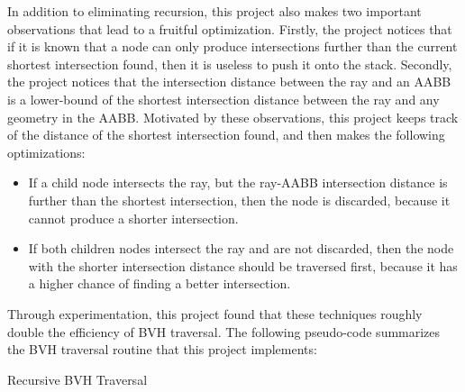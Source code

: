 In addition to eliminating recursion, this project also makes two important observations that lead to a fruitful optimization. Firstly, the project notices that if it is known that a node can only produce intersections further than the current shortest intersection found, then it is useless to push it onto the stack. Secondly, the project notices that the intersection distance between the ray and an AABB is a lower-bound of the shortest intersection distance between the ray and any geometry in the AABB. Motivated by these observations, this project keeps track of the distance of the shortest intersection found, and then makes the following optimizations:
\begin{itemize}
    \item If a child node intersects the ray, but the ray-AABB intersection distance is further than the shortest intersection, then the node is discarded, because it cannot produce a shorter intersection.
    \item If both children nodes intersect the ray and are not discarded, then the node with the shorter intersection distance should be traversed first, because it has a higher chance of finding a better intersection.
\end{itemize}
Through experimentation, this project found that these techniques roughly double the efficiency of BVH traversal. The following pseudo-code summarizes the BVH traversal routine that this project implements:

\begin{algorithm}[H]
    \label{algo bvh traversal}
    \caption{Recursive BVH Traversal}
\end{algorithm} 

